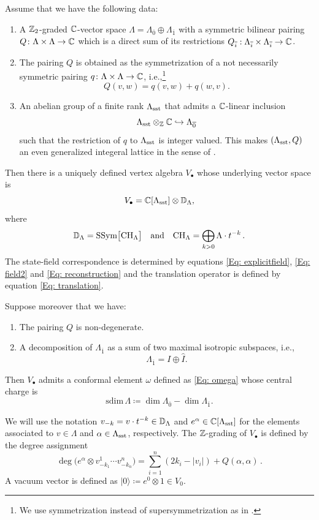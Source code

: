 \documentclass[a4paper, 12pt]{amsart}
\begin{document}
\begin{theorem}[Kac]\label{thm: voaconstruction}
Assume that we have the following data:
\begin{enumerate}
    \item A ${\mathbb{Z}}_2$-graded ${\mathbb{C}}$-vector space $\Lambda=\Lambda_{\overline 0}\oplus \Lambda_{\overline 1}$ with a symmetric bilinear pairing $Q\colon \Lambda\times \Lambda\to {\mathbb{C}}$ which is a direct sum of its restrictions $Q_{\overline{i}}:\Lambda_{\overline i}\times \Lambda_{\overline i}\to {\mathbb{C}}$.
\item The pairing $Q$ is obtained as the symmetrization of a not necessarily symmetric pairing $q\colon \Lambda\times \Lambda\to {\mathbb{C}}$, i.e.,\footnote{We use symmetrization instead of supersymmetrization as in \cite{Gr19}.}
\[Q(v, w)=q(v, w)+q(w, v).\] 
\item An abelian group of a finite rank $\Lambda_{\text{sst}}$ that admits a ${\mathbb{C}}$-linear inclusion 
\[\Lambda_{\text{sst}}\otimes_{{\mathbb{Z}}}{\mathbb{C}}\hookrightarrow \Lambda_{\overline 0}\]
such that the restriction of $q$ to $\Lambda_{\text{sst}}$ is integer valued. This makes $(\Lambda_{\text{sst}}, Q)$ an even generalized integeral lattice in the sense of \cite[Section 3]{Gr19}. 
\end{enumerate}
Then there is a uniquely defined vertex algebra $V_\bullet$ whose underlying vector space is
\[V_\bullet={\mathbb{C}}[\Lambda_{\text{sst}}]\otimes {\mathbb{D}}_{\Lambda},\]
where
\[{\mathbb{D}}_{\Lambda} = \text{SSym}\big[\text{CH}_{\Lambda}\big]\quad\text{and}\quad \text{CH}_{\Lambda}  =\bigoplus_{k>0} \Lambda \cdot t^{-k}\,.\]
The state-field correspondence is determined by equations \eqref{Eq: explicitfield}, \eqref{Eq: field2} and \eqref{Eq: reconstruction} and the translation operator is defined by equation \eqref{Eq: translation}. 

Suppose moreover that we have:
\begin{enumerate}
\item[(4)] The pairing $Q$ is non-degenerate.
\item[(5)] A decomposition of $\Lambda_{\overline 1}$ as a sum of two maximal isotropic subspaces, i.e.,
\[\Lambda_{\overline 1}=I\oplus \hat I.\]
\end{enumerate}
Then $V_\bullet$ admits a conformal element $\omega$ defined as \eqref{Eq: omega} whose central charge is
\[\mathrm{sdim}\, \Lambda\coloneqq\dim \Lambda_{\overline 0}-\dim \Lambda_{\overline{1}}.\]
\end{theorem}

We will use the notation $v_{-k}=v \cdot t^{-k}\in {\mathbb{D}}_\Lambda$ and $e^\alpha\in {\mathbb{C}}[\Lambda_{\text{sst}}]$ for the elements associated to $v\in \Lambda$ and $\alpha\in \Lambda_{\text{sst}}$, respectively. The ${\mathbb{Z}}$-grading of $V_\bullet$ is defined by the degree assignment
$$
\deg \Big(e^{\alpha}\otimes v_{-k_1}^1\cdots v_{-k_n}^n\Big) = \sum_{i=1}^n (2k_i-|v_i|) + Q(\alpha,\alpha)\,.
$$
A vacuum vector is defined as $|0\rangle\coloneqq e^0\otimes 1\in V_0$. 
\end{document}
